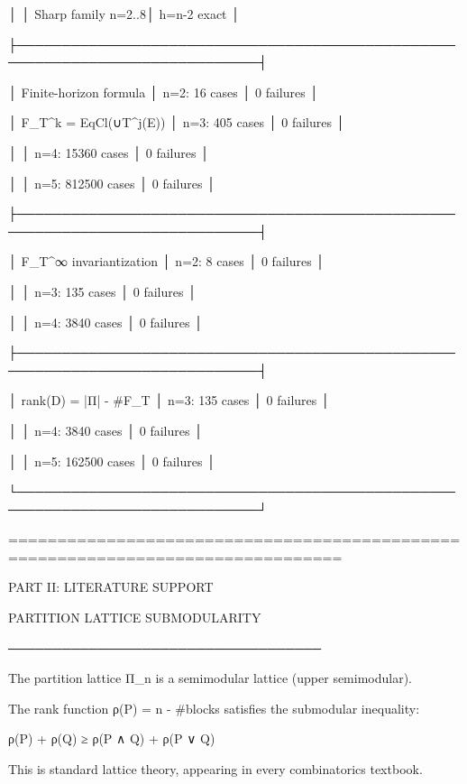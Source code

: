 │                         │ Sharp family n=2..8│ h=n-2 exact                  │

├─────────────────────────────────────────────────────────────────────────────┤

│ Finite-horizon formula  │ n=2: 16 cases      │ 0 failures                   │

│ F_T^k = EqCl(∪T^j(E))   │ n=3: 405 cases     │ 0 failures                   │

│                         │ n=4: 15360 cases   │ 0 failures                   │

│                         │ n=5: 812500 cases  │ 0 failures                   │

├─────────────────────────────────────────────────────────────────────────────┤

│ F_T^∞ invariantization  │ n=2: 8 cases       │ 0 failures                   │

│                         │ n=3: 135 cases     │ 0 failures                   │

│                         │ n=4: 3840 cases    │ 0 failures                   │

├─────────────────────────────────────────────────────────────────────────────┤

│ rank(D) = |Π| - #F_T    │ n=3: 135 cases     │ 0 failures                   │

│                         │ n=4: 3840 cases    │ 0 failures                   │

│                         │ n=5: 162500 cases  │ 0 failures                   │

└─────────────────────────────────────────────────────────────────────────────┘


================================================================================

PART II: LITERATURE SUPPORT




PARTITION LATTICE SUBMODULARITY

───────────────────────────────────

The partition lattice Π_n is a semimodular lattice (upper semimodular).

The rank function ρ(P) = n - #blocks satisfies the submodular inequality:




ρ(P) + ρ(Q) ≥ ρ(P ∧ Q) + ρ(P ∨ Q)


This is standard lattice theory, appearing in every combinatorics textbook.

